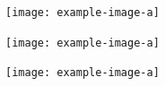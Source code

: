 \documentclass{article}
\begin{document}
\begin{answer}[title=Plot,height=9.5cm,width=\linewidth]
    \centering
    \texttt{[image: example-image-a]}
\end{answer}

\begin{answer}[title=Plot,height=9.5cm,width=\linewidth]
    \centering
    \texttt{[image: example-image-a]}
\end{answer}

\begin{answer}[title=Plot,height=9.5cm,width=\linewidth]
    \centering
    \texttt{[image: example-image-a]}
\end{answer}
\end{document}
